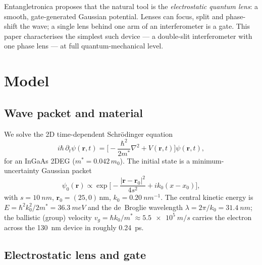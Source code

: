 \documentclass[11pt,a4paper]{article}
\newcommand{\ent}{Entangletronica}
\begin{document}
\ent{} proposes that the natural tool is the \emph{electrostatic quantum lens}:
a smooth, gate-generated Gaussian potential. Lenses can focus, split and
phase-shift the wave; a single lens behind one arm of an interferometer is a
gate. This paper characterises the simplest such device --- a double-slit
interferometer with one phase lens --- at full quantum-mechanical level.

\section{Model}
\label{sec:model}

\subsection{Wave packet and material}
\label{sec:packet}

We solve the 2D time-dependent Schr\"odinger equation
\begin{equation}
i\hbar\,\partial_t\psi(\bm r,t) = \Big[-\frac{\hbar^2}{2m^*}\nabla^2 +
V(\bm r,t)\Big]\psi(\bm r,t),
\label{eq:schr}
\end{equation}
for an InGaAs 2DEG ($m^* = 0.042\,m_0$). The initial state is a
minimum-uncertainty Gaussian packet
\begin{equation}
\psi_0(\bm r) \propto \exp\!\Big[-\frac{|\bm r-\bm r_0|^2}{4s^2}
+ i k_0 (x-x_0)\Big],
\label{eq:packet}
\end{equation}
with $s = \SI{10}{nm}$, $\bm r_0 = (25,0)\,\text{nm}$, $k_0 =
\SI{0.20}{nm^{-1}}$. The central kinetic energy is
$E = \hbar^2 k_0^2/2m^* = \SI{36.3}{meV}$ and the de~Broglie wavelength
$\lambda = 2\pi/k_0 = \SI{31.4}{nm}$; the ballistic (group) velocity
$v_g = \hbar k_0/m^* \approx \SI{5.5e5}{m/s}$ carries the electron across the
\SI{130}{nm} device in roughly \SI{0.24}{ps}.

\subsection{Electrostatic lens and gate}
\label{sec:lens}
\end{document}
